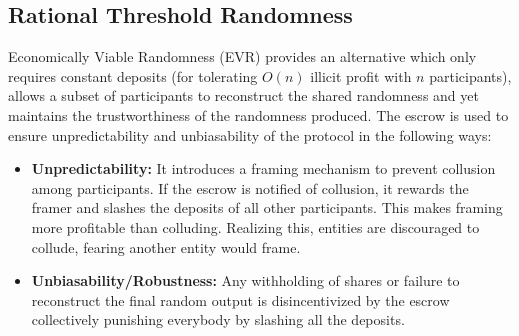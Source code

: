 \documentclass[letterpaper,twocolumn,10pt]{article}
\theoremstyle{definition}
\theoremstyle{remark}
\begin{document}
\subsection{Rational Threshold Randomness}
Economically Viable Randomness (EVR) \cite{david2020economically} provides an alternative which only requires constant deposits (for tolerating $O(n)$ illicit profit with $n$ participants), allows a subset of participants to reconstruct the shared randomness and yet maintains the trustworthiness of the randomness produced. The escrow is used to ensure unpredictability and unbiasability of the protocol in the following ways: 
\begin{itemize}
    \item \textbf{Unpredictability:} It introduces a framing mechanism to prevent collusion among participants. If the escrow is notified of collusion, it rewards the framer and slashes the deposits of all other participants. This makes framing more profitable than colluding. Realizing this, entities are discouraged to collude, fearing another entity would frame.
    \item \textbf{Unbiasability/Robustness:} Any withholding of shares or failure to reconstruct the final random output is disincentivized by the escrow collectively punishing everybody by slashing all the deposits.
\end{itemize}
\end{document}
